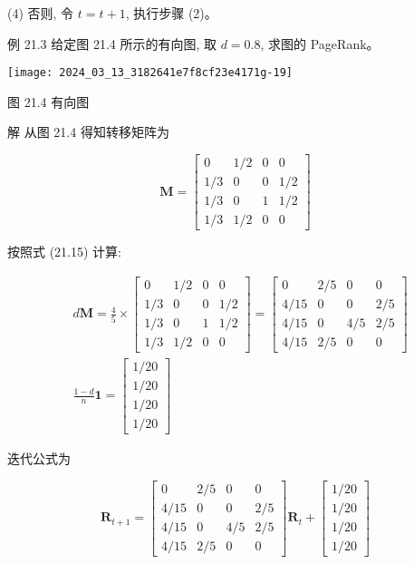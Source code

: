 \documentclass[10pt]{article}
\begin{document}
\begin{CJK*}{UTF8}{bsmi}
(4) 否则, 令 $t=t+1$, 执行步骤 (2)。

例 21.3 给定图 21.4 所示的有向图, 取 $d=0.8$, 求图的 PageRank。

\begin{center}
\texttt{[image: 2024\_03\_13\_3182641e7f8cf23e4171g-19]}
\end{center}

图 21.4 有向图

解 从图 21.4 得知转移矩阵为

$$
\boldsymbol{M}=\left[\begin{array}{cccc}
0 & 1 / 2 & 0 & 0 \\
1 / 3 & 0 & 0 & 1 / 2 \\
1 / 3 & 0 & 1 & 1 / 2 \\
1 / 3 & 1 / 2 & 0 & 0
\end{array}\right]
$$

按照式 (21.15) 计算:

$$
\begin{aligned}
& d \boldsymbol{M}=\frac{4}{5} \times\left[\begin{array}{cccc}
0 & 1 / 2 & 0 & 0 \\
1 / 3 & 0 & 0 & 1 / 2 \\
1 / 3 & 0 & 1 & 1 / 2 \\
1 / 3 & 1 / 2 & 0 & 0
\end{array}\right]=\left[\begin{array}{cccc}
0 & 2 / 5 & 0 & 0 \\
4 / 15 & 0 & 0 & 2 / 5 \\
4 / 15 & 0 & 4 / 5 & 2 / 5 \\
4 / 15 & 2 / 5 & 0 & 0
\end{array}\right] \\
& \frac{1-d}{n} \boldsymbol{1}=\left[\begin{array}{c}
1 / 20 \\
1 / 20 \\
1 / 20 \\
1 / 20
\end{array}\right]
\end{aligned}
$$

迭代公式为

$$
\boldsymbol{R}_{t+1}=\left[\begin{array}{cccc}
0 & 2 / 5 & 0 & 0 \\
4 / 15 & 0 & 0 & 2 / 5 \\
4 / 15 & 0 & 4 / 5 & 2 / 5 \\
4 / 15 & 2 / 5 & 0 & 0
\end{array}\right] \boldsymbol{R}_{t}+\left[\begin{array}{c}
1 / 20 \\
1 / 20 \\
1 / 20 \\
1 / 20
\end{array}\right]
$$


\end{CJK*}
\end{document}

